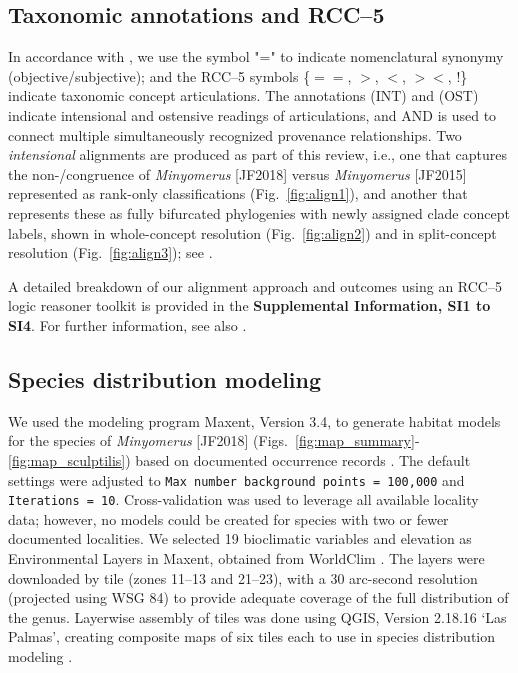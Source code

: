 \documentclass[fleqn,10pt,lineno]{wlpeerj} %
\begin{document}
	\subsection*{Taxonomic annotations and RCC--5}\label{ssec:taxanno} 
		In accordance with \citet{jansen2015}, we use the symbol "=" to indicate nomenclatural synonymy (objective/subjective); and the RCC--5 symbols \{$==$, $>$, $<$, $><$, !\} indicate taxonomic concept articulations.
		The annotations (INT) and (OST) indicate intensional and ostensive readings of articulations, and AND is used to connect multiple simultaneously recognized provenance relationships.
		Two \emph{intensional} alignments are produced as part of this review, i.e., one that captures the non-/congruence of \textit{Minyomerus} [JF2018] versus \textit{Minyomerus} [JF2015] represented as rank-only classifications (Fig.~\ref{fig:align1}), and another that represents these as fully bifurcated phylogenies with newly assigned clade concept labels, shown in whole-concept resolution (Fig.~\ref{fig:align2}) and in split-concept resolution (Fig.~\ref{fig:align3}); see \citet{fea2018}.
		
		A detailed breakdown of our alignment approach and outcomes using an RCC--5 logic reasoner toolkit \citep{chen2014} is provided in the \textbf{Supplemental Information, SI1 to SI4}. For further information, see also \citet{jansen2015, fea2016a, fea2016b}.
	
	\subsection*{Species distribution modeling}\label{ssec:dismo} 
		We used the modeling program Maxent, Version 3.4, to generate habitat models for the species of \textit{Minyomerus} [JF2018] (Figs.~\ref{fig:map_summary}-\ref{fig:map_sculptilis}) based on documented occurrence records \citep{phillips2004, phillips2006, elith2011}.
		The default settings were adjusted to \texttt{Max number background points = 100,000} and \texttt{Iterations = 10}.
		Cross-validation was used to leverage all available locality data; however, no models could be created for species with two or fewer documented localities.
		We selected 19 bioclimatic variables and elevation as Environmental Layers in Maxent, obtained from WorldClim \citep{hijmans2005}.
		The layers were downloaded by tile (zones 11–13 and 21–23), with a 30 arc-second resolution (projected using WSG 84) to provide adequate coverage of the full distribution of the genus.
		Layerwise assembly of tiles was done using QGIS, Version 2.18.16 `Las Palmas', creating composite maps of six tiles each to use in species distribution modeling \citep{qgis2018}.
		
\end{document}
